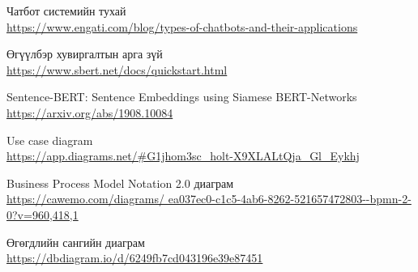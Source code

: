 \singlespace
{}
\begin{thebibliography}{99}
	Чатбот системийн тухай
	\\\url{https://www.engati.com/blog/types-of-chatbots-and-their-applications}

	Өгүүлбэр хувиргалтын арга зүй
	\\\url{https://www.sbert.net/docs/quickstart.html}
	
	Sentence-BERT: Sentence Embeddings using Siamese BERT-Networks
	\\\url{https://arxiv.org/abs/1908.10084}

	Use case diagram
	\\\url{https://app.diagrams.net/#G1jhom3sc_holt-X9XLALtQja_Gl_Eykhj}

	Business Process Model Notation 2.0 диаграм
	\\\url{https://cawemo.com/diagrams/
	ea037ec0-c1c5-4ab6-8262-521657472803--bpmn-2-0?v=960,418,1}

	Өгөгдлийн сангийн диаграм
	\\\url{https://dbdiagram.io/d/6249fb7cd043196e39e87451}
\end{thebibliography}
